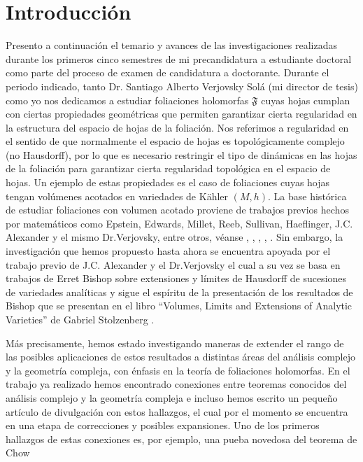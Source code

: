 \documentclass{article}
\begin{document}
\section{Introducci\'on}
\noindent Presento a continuaci\'on el temario y avances de las investigaciones realizadas durante los primeros cinco semestres 
de mi precandidatura a estudiante doctoral como parte del proceso de examen de candidatura a doctorante.
Durante el periodo indicado, tanto Dr. Santiago Alberto Verjovsky Sol\'a (mi director de tesis) como yo nos dedicamos a estudiar
foliaciones holomorfas $\mathfrak{F}$ cuyas hojas cumplan con ciertas propiedades geom\'etricas que permiten garantizar cierta regularidad en 
la estructura del espacio de hojas de la foliaci\'on. Nos referimos a regularidad en el sentido de que normalmente el 
espacio de hojas es topol\'ogicamente complejo (no Hausdorff), por lo que es necesario restringir el tipo de din\'amicas en las hojas 
de la foliaci\'on para garantizar cierta regularidad topol\'ogica en el espacio de hojas. Un ejemplo de estas propiedades es el caso de foliaciones cuyas hojas tengan 
vol\'umenes acotados en variedades de K\"ahler $(M,h)$. 
La base hist\'orica de estudiar foliaciones con volumen acotado proviene de trabajos previos hechos por matem\'aticos como
Epstein, Edwards, Millet, Reeb, Sullivan, Haeflinger, J.C. Alexander y el mismo Dr.Verjovsky, entre otros, v\'eanse \cite{EMS}, \cite{V-A}, \cite{E-V}, \cite{Epstein1}, \cite{Epstein2}.
Sin embargo, la investigaci\'on que hemos propuesto hasta ahora se encuentra apoyada por el trabajo previo de J.C. Alexander y el 
Dr.Verjovsky \cite{A-V} el cual a su vez se basa en trabajos de Erret Bishop \cite{Bishop} sobre extensiones y l\'imites de Hausdorff
de sucesiones de variedades anal\'iticas y sigue el esp\'iritu de la presentaci\'on de los resultados de Bishop que se presentan en el 
libro ``Volumes, Limits and Extensions of Analytic Varieties'' de Gabriel Stolzenberg \cite{Stolzenberg}.

M\'as precisamente, hemos estado investigando maneras de extender el rango de las posibles aplicaciones de estos resultados a
distintas \'areas del an\'alisis complejo y la geometr\'ia compleja, con \'enfasis en la teor\'ia de foliaciones holomorfas. En el trabajo
ya realizado hemos encontrado conexiones entre teoremas conocidos del an\'alisis complejo y la geometr\'ia compleja e incluso hemos
escrito un pequeño art\'iculo de divulgaci\'on con estos hallazgos, el cual por el momento se encuentra en una etapa de correcciones
y posibles expansiones. Uno de los primeros hallazgos de estas conexiones es, por ejemplo, una pueba novedosa del teorema 
de Chow \cite{Chow}
\end{document}
